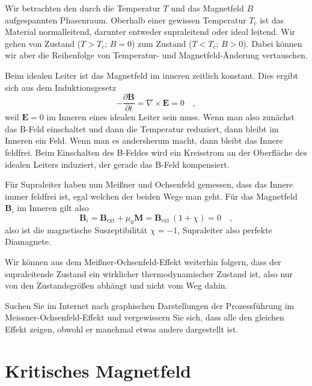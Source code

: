 Wir betrachten den durch die Temperatur $T$ und das Magnetfeld $B$ aufgespannten Phasenraum. Oberhalb einer gewissen Temperatur $T_c$ ist das Material normalleitend, darunter entweder supraleitend oder ideal leitend. Wir gehen von Zustand  ($T > T_c$; $B=0$) zum Zustand ($T < T_c$; $B > 0$). Dabei können wir aber die Reihenfolge von Temperatur- und Magnetfeld-Änderung vertauschen.

Beim idealen Leiter ist das Magnetfeld im inneren zeitlich konstant. Dies ergibt sich aus dem Induktionsgesetz
\begin{equation}
    - \frac{\partial \bm{B}}{\partial t} = \nabla \times \bm{E} = 0 \quad ,
\end{equation}
weil $ \bm{E} = 0$ im Inneren eines idealen Leiter sein muss. Wenn man also zunächst das B-Feld einschaltet und dann die Temperatur reduziert, dann bleibt im Inneren ein Feld. Wenn man es andersherum macht, dann bleibt das Innere feldfrei. Beim Einschalten des B-Feldes wird ein Kreisstrom an der Oberfläche des idealen Leiters induziert, der gerade das B-Feld kompensiert.

Für Supraleiter haben nun Meißner und Ochsenfeld gemessen, dass das Innere immer feldfrei ist, egal welchen der beiden Wege man geht. Für das Magnetfeld $\bm{B}_i$ im Inneren gilt also
\begin{equation}
    \bm{B}_i = \bm{B}_\text{ext} +  \mu_0 \bm{M} =\bm{B}_\text{ext}  \, (1 + \chi)  = 0 \quad ,
\end{equation}
also ist die magnetische Suszeptibilität $\chi = -1$, Supraleiter also perfekte Diamagnete.

Wir können aus dem Meißner-Ochsenfeld-Effekt weiterhin folgern, dass der supraleitende Zustand ein wirklicher thermodynamischer Zustand ist, also nur von den Zustandsgrößen abhängt und nicht vom Weg dahin.

\begin{questions} 
\item Suchen Sie im Internet nach graphischen Darstellungen der Prozessführung im Meissner-Ochsenfeld-Effekt und vergewissern Sie sich, dass alle den gleichen Effekt zeigen, obwohl er manchmal etwas anders dargestellt ist.
\end{questions}


 
\section*{Kritisches Magnetfeld}

